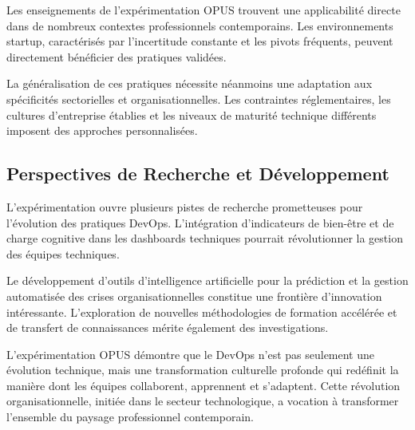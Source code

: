 \documentclass[12pt,a4paper]{article}
\begin{document}
Les enseignements de l'expérimentation OPUS trouvent une applicabilité directe dans de nombreux contextes professionnels contemporains. Les environnements startup, caractérisés par l'incertitude constante et les pivots fréquents, peuvent directement bénéficier des pratiques validées.

La généralisation de ces pratiques nécessite néanmoins une adaptation aux spécificités sectorielles et organisationnelles. Les contraintes réglementaires, les cultures d'entreprise établies et les niveaux de maturité technique différents imposent des approches personnalisées.

\subsection{Perspectives de Recherche et Développement}

L'expérimentation ouvre plusieurs pistes de recherche prometteuses pour l'évolution des pratiques DevOps. L'intégration d'indicateurs de bien-être et de charge cognitive dans les dashboards techniques pourrait révolutionner la gestion des équipes techniques.

Le développement d'outils d'intelligence artificielle pour la prédiction et la gestion automatisée des crises organisationnelles constitue une frontière d'innovation intéressante. L'exploration de nouvelles méthodologies de formation accélérée et de transfert de connaissances mérite également des investigations.

L'expérimentation OPUS démontre que le DevOps n'est pas seulement une évolution technique, mais une transformation culturelle profonde qui redéfinit la manière dont les équipes collaborent, apprennent et s'adaptent. Cette révolution organisationnelle, initiée dans le secteur technologique, a vocation à transformer l'ensemble du paysage professionnel contemporain.
\end{document}
